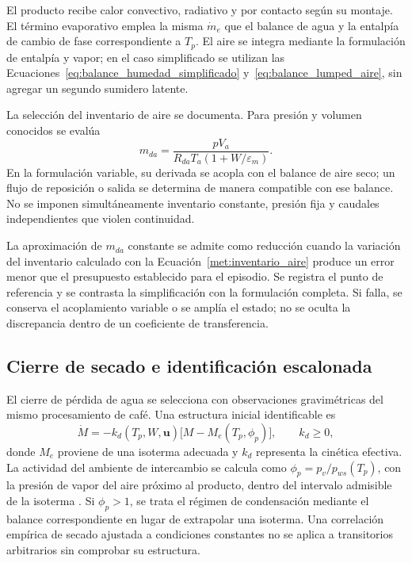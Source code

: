 El producto recibe calor convectivo, radiativo y por contacto según su montaje. El término evaporativo emplea la misma $\dot m_e$ que el balance de agua y la entalpía de cambio de fase correspondiente a $T_p$. El aire se integra mediante la formulación de entalpía y vapor; en el caso simplificado se utilizan las Ecuaciones~\ref{eq:balance_humedad_simplificado} y~\ref{eq:balance_lumped_aire}, sin agregar un segundo sumidero latente.

La selección del inventario de aire se documenta. Para presión y volumen conocidos se evalúa
\begin{equation}
m_{da}=\frac{pV_a}
{R_{da}T_a(1+W/\varepsilon_m)}.
\label{met:inventario_aire}
\end{equation}
En la formulación variable, su derivada se acopla con el balance de aire seco; un flujo de reposición o salida se determina de manera compatible con ese balance. No se imponen simultáneamente inventario constante, presión fija y caudales independientes que violen continuidad.

La aproximación de $m_{da}$ constante se admite como reducción cuando la variación del inventario calculado con la Ecuación~\ref{met:inventario_aire} produce un error menor que el presupuesto establecido para el episodio. Se registra el punto de referencia y se contrasta la simplificación con la formulación completa. Si falla, se conserva el acoplamiento variable o se amplía el estado; no se oculta la discrepancia dentro de un coeficiente de transferencia.

\subsection{Cierre de secado e identificación escalonada}
\label{met:identificacion}

El cierre de pérdida de agua se selecciona con observaciones gravimétricas del mismo procesamiento de café. Una estructura inicial identificable es
\begin{equation}
\dot M=-k_d(T_p,W,\mathbf u)
\bigl[M-M_e(T_p,\phi_p)\bigr],
\qquad k_d\geq0,
\label{met:cierre_secado}
\end{equation}
donde $M_e$ proviene de una isoterma adecuada y $k_d$ representa la cinética efectiva. La actividad del ambiente de intercambio se calcula como $\phi_p=p_v/p_{ws}(T_p)$, con la presión de vapor del aire próximo al producto, dentro del intervalo admisible de la isoterma \cite{correa2010,timmermann2001}. Si $\phi_p>1$, se trata el régimen de condensación mediante el balance correspondiente en lugar de extrapolar una isoterma. Una correlación empírica de secado ajustada a condiciones constantes no se aplica a transitorios arbitrarios sin comprobar su estructura.

